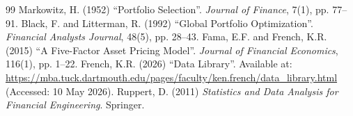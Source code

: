 \documentclass[11pt,a4paper]{article}
\begin{document}

\begin{thebibliography}{99}
 Markowitz, H. (1952) ``Portfolio Selection''. \textit{Journal of Finance}, 7(1), pp. 77--91.
 Black, F. and Litterman, R. (1992) ``Global Portfolio Optimization''. \textit{Financial Analysts Journal}, 48(5), pp. 28--43.
 Fama, E.F. and French, K.R. (2015) ``A Five-Factor Asset Pricing Model''. \textit{Journal of Financial Economics}, 116(1), pp. 1--22.
 French, K.R. (2026) ``Data Library''. Available at: \url{https://mba.tuck.dartmouth.edu/pages/faculty/ken.french/data_library.html} (Accessed: 10 May 2026).
 Ruppert, D. (2011) \textit{Statistics and Data Analysis for Financial Engineering}. Springer.
\end{thebibliography}
\end{document}
